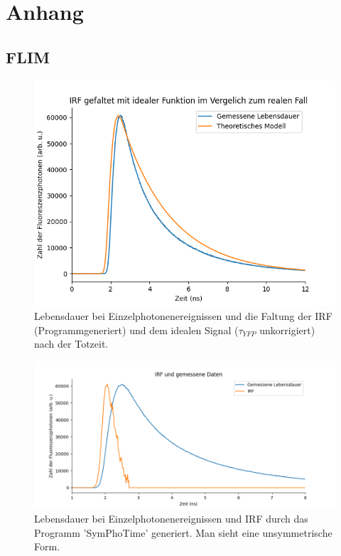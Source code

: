 

\chapter{Anhang}
\label{chap:anhangA}
\section{FLIM}

\begin{figure}[h]
    \centering
    \includegraphics[width = \linewidth]{Bilder/Auswertung/IRFProgConvol.png}
    \caption{Lebensdauer bei Einzelphotonenereignissen und die Faltung der IRF (Programmgeneriert) und dem idealen Signal ($\tau_{YFP}$ unkorrigiert) nach der Totzeit. }
    \label{bild:IRFconvProg}
\end{figure}


\begin{figure}[h]
    \centering
    \includegraphics[width = \linewidth]{Bilder/Auswertung/IRFProg.png}
    \caption{ Lebensdauer bei Einzelphotonenereignissen und IRF durch das Programm 'SymPhoTime' generiert. Man sieht eine unsymmetrische Form.}
    \label{bild:IRFProg}
\end{figure}
